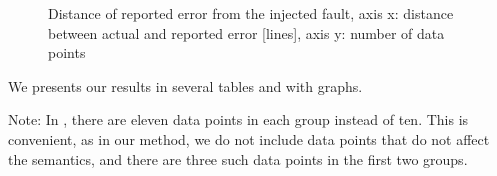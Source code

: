 \documentclass[10pt]{report}
\begin{document}
\begin{figure}[p]
    \centering
    \setlength\fboxsep{0pt}
    \setlength\fboxrule{0pt}
    \caption{Distance of reported error from the injected fault, axis x: distance between actual and reported error [lines], axis y: number of data points}
    \label{linedistance}
\end{figure}


We presents our results in several tables and with graphs.


Note: In \cite{nugee}, there are eleven data points in each group instead of ten.  This is convenient, as in our method, we do not include data points that do not affect the semantics, and there are three such data points in the first two groups.


\end{document}
